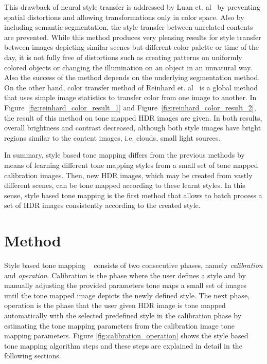 This drawback of neural style transfer is addressed by Luan et. al~\cite{luan2017deep} by preventing spatial distortions and allowing transformations only in color space. Also by including semantic segmentation, the style transfer between unrelated contents are prevented. While this method produces very pleasing results for style transfer between images depicting similar scenes but different color palette or time of the day, it is not fully free of distortions such as creating patterns on uniformly colored objects or changing the illumination on an object in an unnatural way. Also the success of the method depends on the underlying segmentation method. On the other hand, color transfer method of Reinhard et. al~\cite{reinhard2001color} is a global method that uses simple image statistics to transfer color from one image to another. In Figure~\ref{fig:reinhard_color_result_1} and Figure~\ref{fig:reinhard_color_result_2}, the result of this method on tone mapped HDR images are given. In both results, overall brightness and contrast decreased, although both style images have bright regions similar to the content images, i.e. clouds, small light sources.

In summary, style based tone mapping differs from the previous methods by means of learning different tone mapping styles from a small set of tone mapped calibration images. Then, new HDR images, which may be created from vastly different scenes, can be tone mapped according to these learnt styles. In this sense, style based tone mapping is the first method that allows to batch process a set of HDR images consistently according to the created style.

\section{Method}
Style based tone mapping ~\cite{akyuz2013style} consists of two consecutive phases, namely \emph{calibration} and \emph{operation}. Calibration is the phase where the user defines a style and by manually adjusting the provided parameters tone maps a small set of images until the tone mapped image depicts the newly defined style. The next phase, operation is the phase that the user given HDR image is tone mapped automatically with the selected predefined style in the calibration phase by estimating the tone mapping parameters from the calibration image tone mapping parameters. Figure \ref{fig:calibration_operation} shows the style based tone mapping algorithm steps and these steps are explained in detail in the following sections.

